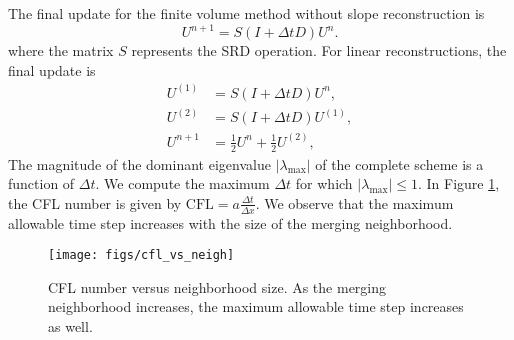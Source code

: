The final update for the finite volume method without slope reconstruction is
$$
U^{n+1} = S(I + \Delta t D)U^n.
$$
where the matrix $S$ represents the SRD operation. 
For linear reconstructions, the final update is
\begin{equation}
\begin{aligned}
    U^{(1)} &= S(I + \Delta t D)U^n, \\
    U^{(2)} &= S(I + \Delta t D)U^{(1)},\\
    U^{n+1} &= \frac{1}{2}U^n + \frac{1}{2}U^{(2)},
\end{aligned}
\end{equation}
The magnitude of the dominant eigenvalue $|\lambda_{\text{max}}|$ of the complete scheme is a function of $\Delta t$.  We compute the maximum $\Delta t$ for which $|\lambda_{\max}| \leq 1$.  In Figure \ref{fig:cflvsneigh}, the CFL number is given by $\text{CFL} = a\frac{\Delta t}{\Delta x}$.  
We observe that the maximum allowable time step increases with the size of the merging neighborhood.
\begin{figure}
	\centering
	\texttt{[image: figs/cfl\_vs\_neigh]}
	\caption{CFL number versus neighborhood size.  As the merging neighborhood increases, the maximum allowable time step increases as well.}
	\label{fig:cflvsneigh}
\end{figure}

 
